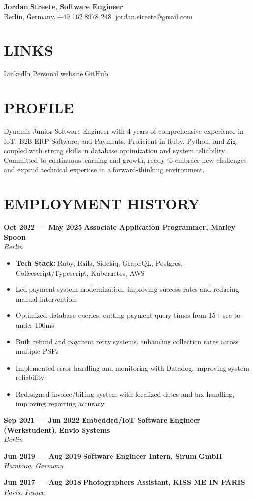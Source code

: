 \documentclass[11pt,a4paper]{article}
\newcommand{\resumesection}[1]{
  \section*{\textcolor{sectioncolor}{\MakeUppercase{#1}}}
}
\newcommand{\job}[4]{
  \textbf{#1 — #2} \hfill \textbf{#3} \\
  \textit{#4}
}
\begin{document}
{\LARGE\textbf{Jordan Streete, Software Engineer}}\\
Berlin, Germany, +49 162 8978 248, \href{mailto:jordan.streete@gmail.com}{jordan.streete@gmail.com}

\resumesection{Links}
\href{https://www.linkedin.com/in/jordan-streete-0b8b3711a/}{LinkedIn} \hfill
\href{https://jstr.dev}{Personal website} \hfill
\href{https://github.com/BoundlessCarrot}{GitHub}

\resumesection{Profile}
Dynamic Junior Software Engineer with 4 years of comprehensive experience in IoT, B2B ERP Software, and Payments. Proficient in Ruby, Python, and Zig, coupled with strong skills in database optimization and system reliability. Committed to continuous learning and growth, ready to embrace new challenges and expand technical expertise in a forward-thinking environment.

\resumesection{Employment \hspace{0.1em} History}

\job{Oct 2022} {May 2025} {Associate Application Programmer, Marley Spoon} {Berlin}
\begin{itemize}[leftmargin=*,label=$\bullet$,itemsep=0.3ex]
    \item \textbf{Tech Stack:} Ruby, Rails, Sidekiq, GraphQL, Postgres, Coffeescript/Typescript, Kubernetes, AWS
    \item Led payment system modernization, improving success rates and reducing manual intervention
    \item Optimized database queries, cutting payment query times from 15+ sec to under 100ms
    \item Built refund and payment retry systems, enhancing collection rates across multiple PSPs
    \item Implemented error handling and monitoring with Datadog, improving system reliability
    \item Redesigned invoice/billing system with localized dates and tax handling, improving reporting accuracy
\end{itemize}
  
\job{Sep 2021} {Jun 2022} {Embedded/IoT Software Engineer (Werkstudent), Envio Systems} {Berlin}

\job{Jun 2019} {Aug 2019} {Software Engineer Intern, Sirum GmbH} {Hamburg, Germany}

\job{Jun 2017} {Aug 2018} {Photographers Assistant, KISS ME IN PARIS} {Paris, France}
\end{document}
